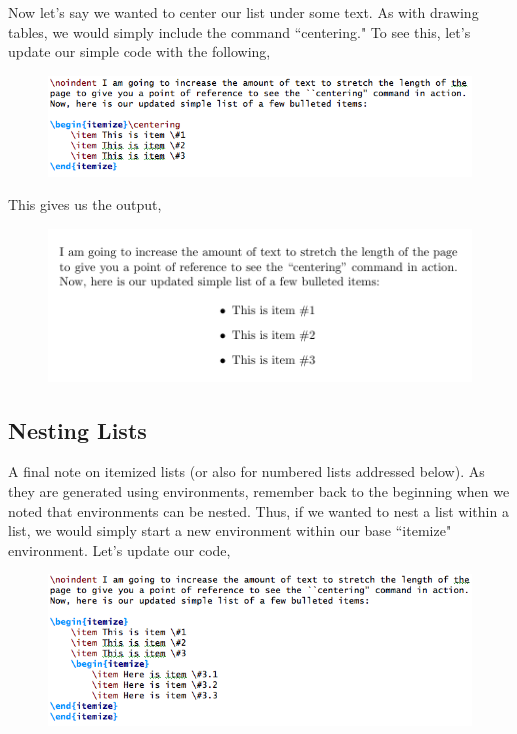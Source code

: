 \documentclass[11pt]{article}
\newcommand{\forceindent}{\leavevmode{\parindent=1.5em\indent}} %
\begin{document}
\forceindent Now let's say we wanted to center our list under some text. As with drawing tables, we would simply include the command ``centering." To see this, let's update our simple code with the following,

\begin{figure}[!h]
	\includegraphics[scale=.6]{CODE9} \\
	\centering
\end{figure}

This gives us the output, \\

\begin{figure}[!h]
	\includegraphics[scale=.6]{OUT9} \\
	\centering
\end{figure}

\subsection{Nesting Lists}

A final note on itemized lists (or also for numbered lists addressed below). As they are generated using environments, remember back to the beginning when we noted that environments can be nested. Thus, if we wanted to nest a list within a list, we would simply start a new environment within our base ``itemize" environment. Let's update our code,

\begin{figure}[!h]
	\includegraphics[scale=.6]{CODE10} \\
	\centering
\end{figure}
\end{document}
